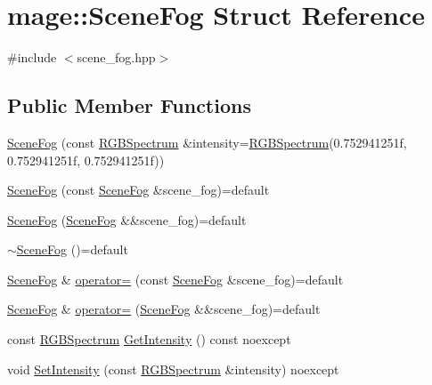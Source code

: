 \hypertarget{structmage_1_1_scene_fog}{}\section{mage\+:\+:Scene\+Fog Struct Reference}
\label{structmage_1_1_scene_fog}


{\ttfamily \#include $<$scene\+\_\+fog.\+hpp$>$}

\subsection*{Public Member Functions}
\begin{DoxyCompactItemize}
\item 
\hyperlink{structmage_1_1_scene_fog_a8d7c8ab962ca172a5bca7115131f6afc}{Scene\+Fog} (const \hyperlink{structmage_1_1_r_g_b_spectrum}{R\+G\+B\+Spectrum} \&intensity=\hyperlink{structmage_1_1_r_g_b_spectrum}{R\+G\+B\+Spectrum}(0.\+752941251f, 0.\+752941251f, 0.\+752941251f))
\item 
\hyperlink{structmage_1_1_scene_fog_a203934b340b718f9b6f136100df62268}{Scene\+Fog} (const \hyperlink{structmage_1_1_scene_fog}{Scene\+Fog} \&scene\+\_\+fog)=default
\item 
\hyperlink{structmage_1_1_scene_fog_a6080ed91eb76b5872646ca8d778a2856}{Scene\+Fog} (\hyperlink{structmage_1_1_scene_fog}{Scene\+Fog} \&\&scene\+\_\+fog)=default
\item 
\hyperlink{structmage_1_1_scene_fog_afb25181d31f74e4981c226019fee0669}{$\sim$\+Scene\+Fog} ()=default
\item 
\hyperlink{structmage_1_1_scene_fog}{Scene\+Fog} \& \hyperlink{structmage_1_1_scene_fog_a2312784458fe9d8e88dcfe5c444866a4}{operator=} (const \hyperlink{structmage_1_1_scene_fog}{Scene\+Fog} \&scene\+\_\+fog)=default
\item 
\hyperlink{structmage_1_1_scene_fog}{Scene\+Fog} \& \hyperlink{structmage_1_1_scene_fog_af019127d949d50173c9d4af51a8dcaef}{operator=} (\hyperlink{structmage_1_1_scene_fog}{Scene\+Fog} \&\&scene\+\_\+fog)=default
\item 
const \hyperlink{structmage_1_1_r_g_b_spectrum}{R\+G\+B\+Spectrum} \hyperlink{structmage_1_1_scene_fog_ac383f82bf8e286ec3478a83fa857f04e}{Get\+Intensity} () const noexcept
\item 
void \hyperlink{structmage_1_1_scene_fog_ac561984466dce2dfe4b0cdfe3c2fde2c}{Set\+Intensity} (const \hyperlink{structmage_1_1_r_g_b_spectrum}{R\+G\+B\+Spectrum} \&intensity) noexcept
\item 

\end{DoxyCompactItemize}

